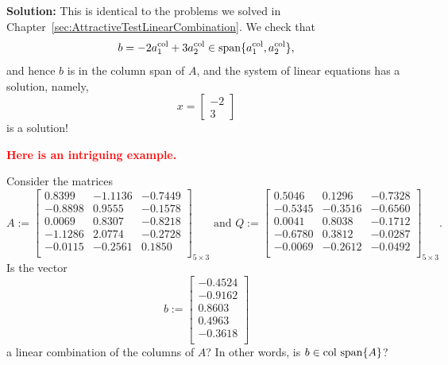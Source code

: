 \textbf{Solution:}  This is identical to the problems we solved in Chapter~\ref{sec:AttractiveTestLinearCombination}. We check that 
$$b=-2 a^{\rm col}_1 +  3 a^{\rm col}_2 \in \mathrm{span} \{ a^{\rm col}_1, a^{\rm col}_2 \},$$
and hence $b$ is in the column span of $A$, and the system of linear equations has a solution, namely,
$$x=\left[\begin{array}{r} -2 \\3 \end{array} \right] $$
is a solution!\Qed


\vspace*{.2cm}

\textcolor{red}{\bf Here is an intriguing example.}

\begin{example}
\label{ex:IlluminatingOrthonormalVectors}
Consider the matrices 
\begin{equation}
A:=\left[
\begin{array}{rrr}
0.8399 & -1.1136 & -0.7449 \\
-0.8898 & 0.9555 & -0.1578 \\
0.0069 & 0.8307 & -0.8218 \\
-1.1286 & 2.0774 & -0.2728 \\
-0.0115 & -0.2561 & 0.1850 \\
\end{array}
\right]_{5 \times 3} \text{ and  } Q:=
\left[
\begin{array}{rrr}
0.5046 & 0.1296 & -0.7328 \\
-0.5345 & -0.3516 & -0.6560 \\
0.0041 & 0.8038 & -0.1712 \\
-0.6780 & 0.3812 & -0.0287 \\
-0.0069 & -0.2612 & -0.0492 \\
\end{array}
\right]_{5 \times 3}.
\end{equation}
Is the vector 
\begin{equation}
b:=\left[
\begin{array}{r}
-0.4524 \\
-0.9162 \\
0.8603 \\
0.4963 \\
-0.3618 \\
\end{array}
\right]
\end{equation}
a linear combination of the columns of $A$? In other words, is $b \in \mathrm{col~span} \{ A \}$?

\end{example}

